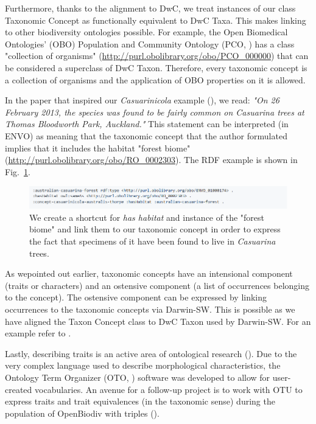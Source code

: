 Furthermore, thanks to the alignment to DwC, we treat instances of our class Taxonomic Concept as functionally equivalent to DwC Taxa. This makes linking to other biodiversity ontologies possible. For example, the Open Biomedical Ontologies' (OBO) Population and Community Ontology (PCO, \cite{walls_semantics_2014}) has a class "collection of organisms" (\url{http://purl.obolibrary.org/obo/PCO_000000}) that can be considered a superclass of DwC Taxon. Therefore, every taxonomic concept is a collection of organisms and the application of OBO properties on it is allowed.

In the paper that inspired our \emph{Casuarinicola} example (\cite{thorpe_casuarinicola_2013}), we read: \emph{"On 26 February 2013, the species was found to be fairly common on Casuarina trees at Thomas Bloodworth Park, Auckland."} This statement can be interpreted (in ENVO) as meaning that the taxonomic concept that the author formulated implies that it includes the habitat "forest biome" (\url{http://purl.obolibrary.org/obo/RO_0002303}). The RDF example is shown in Fig.~\ref{example-envo}.

\begin{figure}[h!]
\centering
  \includegraphics[width=\textwidth]{Figures/example-envo}
  \decoRule
  \caption[Example of combining ENVO with OpenBiodiv-O.]{We create a shortcut for \emph{has habitat} and instance of the "forest biome" and link them to our taxonomic concept in order to express the fact that specimens of it have been found to live in \emph{Casuarina} trees.}
  \label{example-envo}
\end{figure}

As wepointed out earlier, taxonomic concepts have an intensional component (traits or characters) and an ostensive component (a list of occurrences belonging to the concept). The ostensive component can be expressed by linking occurrences to the taxonomic concepts via Darwin-SW. This is possible as we have aligned the Taxon Concept class to DwC Taxon used by Darwin-SW. For an example refer to \cite{baskauf_darwin-sw:_2016}.

Lastly, describing traits is an active area of ontological research (\cite{huang_oto:_2015}). Due to the very complex language used to describe morphological characteristics, the Ontology Term Organizer (OTO, \cite{huang_oto:_2015}) software was developed to allow for user-created vocabularies. An avenue for a follow-up project is to work with OTU to express traits and trait equivalences (in the taxonomic sense) during the population of OpenBiodiv with triples (\cite{hong_explorer_2018}).

